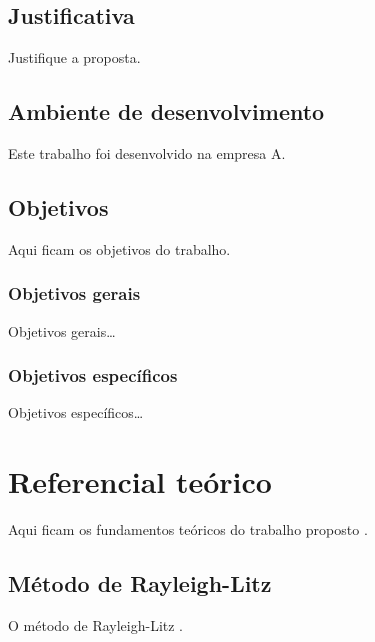 \documentclass[12pt,oneside,english,brazil,lmodern]{ucsmonograph}
\begin{document}
	\section{Justificativa}
	Justifique a proposta.
	
	\section{Ambiente de desenvolvimento}
	Este trabalho foi desenvolvido na empresa A.
	
	\section{Objetivos}
	Aqui ficam os objetivos do trabalho.
	
	\subsection{Objetivos gerais}
	Objetivos gerais\dots
	
	\subsection{Objetivos específicos}
	Objetivos específicos\dots
	
	\chapter{Referencial teórico}
	Aqui ficam os fundamentos teóricos do trabalho proposto \cite{rao:2008}.
	
	\section{Método de Rayleigh-Litz}
	O método de Rayleigh-Litz \cite{cooley:1965}.
	
	\postextual
	
	
	
\end{document}
